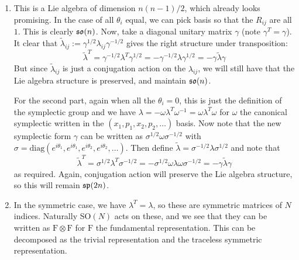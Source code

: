 \documentclass[11pt, class=article, crop=false]{standalone}
\begin{document}
\begin{enumerate}
	 \item This is a Lie algebra of dimension $n(n-1)/2$, which already looks promising. In the case of all $\theta_i$ equal, we can pick basis so that the $R_{ij}$ are all $1$. This is clearly $\frak{so}(n)$. Now, take a diagonal unitary matrix $\gamma$ (note $\gamma^T = \gamma$). It clear that $\tilde \lambda_{ij} := \gamma^{1/2} \lambda_{ij} \gamma^{-1/2}$ gives the right structure under transposition:
	 \[
	 	\tilde \lambda^T = \gamma^{-1/2} \lambda^T \gamma^{1/2} = - \gamma^{-1/2} \lambda \gamma^{1/2} = - \gamma \tilde \lambda \gamma
	 \]
	 But since $\tilde \lambda_{ij}$ is just a conjugation action on the $\lambda_{ij}$, we will still have that the Lie algebra structure is preserved, and maintain $\frak{so}(n)$.
	 
	 For the second part, again when all the $\theta_i = 0$, this is just the definition of the symplectic group and we have $\lambda = - \omega \lambda^T \omega^{-1} = \omega \lambda^T \omega$ for $\omega$ the canonical symplectic written in the $(x_1, p_1, x_2, p_2, \dots)$ basis. Now note that the new symplectic form $\gamma$ can be written as $\sigma^{1/2} \omega \sigma^{-1/2}$ with $\sigma = \mathrm{diag}(e^{i \theta_1}, e^{i\theta_1}, e^{i \theta_2}, e^{i\theta_2}, \dots)$. Then define $\tilde \lambda = \sigma^{-1/2} \lambda \sigma^{1/2}$ and note that
	 \[
	 	\tilde \lambda^T = \sigma^{1/2} \lambda^T \sigma^{-1/2} = - \sigma^{1/2} \omega \lambda \omega \sigma^{-1/2} = - \gamma \tilde \lambda \gamma 
	 \]
	 as required. Again, conjugation action will preserve the Lie algebra structure, so this will remain $\frak{sp}(2n)$.
	 
%
	 \item In the symmetric case, we have $\lambda^T = \lambda$, so these are symmetric matrices of $N$ indices. Naturally $\mathrm{SO}(N)$ acts on these, and we see that they can be written as $\mathrm{F} \otimes \mathrm{F}$ for $\mathrm{F}$ the fundamental representation. This can be decomposed as the trivial representation and the traceless symmetric representation.  
	 

\end{enumerate}
\end{document}
